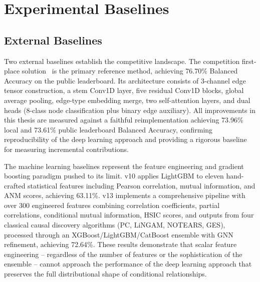 \section{Experimental Baselines}
\label{sec:baselines}

\subsection{External Baselines}
\label{sec:external_baselines}

Two external baselines establish the competitive landscape. The competition first-place solution~\cite{adia_rank1_report} is the primary reference method, achieving 76.70\% Balanced Accuracy on the public leaderboard. Its architecture consists of 3-channel edge tensor construction, a stem Conv1D layer, five residual Conv1D blocks, global average pooling, edge-type embedding merge, two self-attention layers, and dual heads (8-class node classification plus binary edge auxiliary). All improvements in this thesis are measured against a faithful reimplementation achieving 73.96\% local and 73.61\% public leaderboard Balanced Accuracy, confirming reproducibility of the deep learning approach and providing a rigorous baseline for measuring incremental contributions.

The machine learning baselines represent the feature engineering and gradient boosting paradigm pushed to its limit. v10 applies LightGBM to eleven hand-crafted statistical features including Pearson correlation, mutual information, and ANM scores, achieving 63.11\%. v13 implements a comprehensive pipeline with over 300 engineered features combining correlation coefficients, partial correlations, conditional mutual information, HSIC scores, and outputs from four classical causal discovery algorithms (PC, LiNGAM, NOTEARS, GES), processed through an XGBoost/LightGBM/CatBoost ensemble with GNN refinement, achieving 72.64\%. These results demonstrate that scalar feature engineering -- regardless of the number of features or the sophistication of the ensemble -- cannot approach the performance of the deep learning approach that preserves the full distributional shape of conditional relationships.

